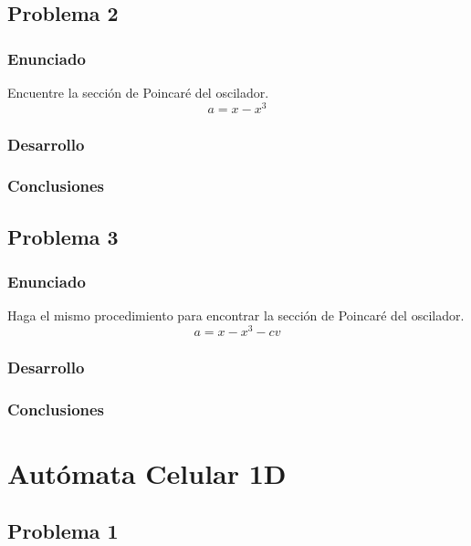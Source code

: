 \documentclass[a4paper,12pt]{article}
\theoremstyle{mytheor}
\begin{document}
\subsection{Problema 2}
\subsubsection{Enunciado}
Encuentre la sección de Poincaré del oscilador.
\begin{equation}
a = x - x^3
\end{equation}

\subsubsection{Desarrollo}

\subsubsection{Conclusiones}

\subsection{Problema 3}
\subsubsection{Enunciado}
 Haga el mismo procedimiento para encontrar la sección de Poincaré del oscilador.
\begin{equation}
a = x - x^3 - cv
\end{equation}
\subsubsection{Desarrollo}

\subsubsection{Conclusiones}

\newpage

\section{Autómata Celular 1D}

\subsection{Problema 1}
\end{document}
